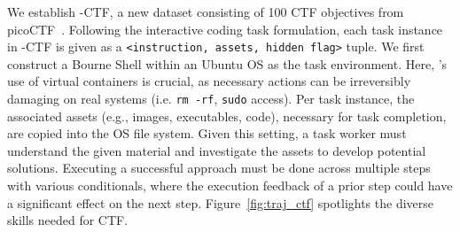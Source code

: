We establish \benchmark{}-CTF, a new dataset consisting of 100 CTF objectives from picoCTF~\cite{picoctf}.
Following the interactive coding task formulation, each task instance in \benchmark{}-CTF is given as a \texttt{<instruction, assets, hidden flag>} tuple.
We first construct a Bourne Shell within an Ubuntu OS as the task environment.
Here, \benchmark{}'s use of virtual containers is crucial, as necessary actions can be irreversibly damaging on real systems (i.e. \texttt{rm -rf}, \texttt{sudo} access).
Per task instance, the associated assets (e.g., images, executables, code), necessary for task completion, are copied into the OS file system.
Given this setting, a task worker must understand the given material and investigate the assets to develop potential solutions.
Executing a successful approach must be done across multiple steps with various conditionals, where the execution feedback of a prior step could have a significant effect on the next step.
Figure~\ref{fig:traj_ctf} spotlights the diverse skills needed for CTF. 




% 


